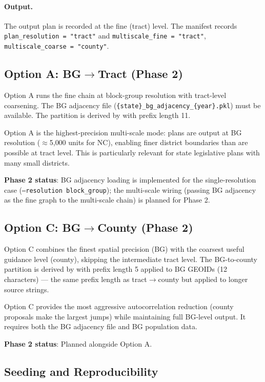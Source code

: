 \paragraph{Output.}
The output plan is recorded at the fine (tract) level.
The manifest records \texttt{plan\_resolution = "tract"} and
\texttt{multiscale\_fine = "tract"}, \texttt{multiscale\_coarse = "county"}.

\subsection{Option A: BG$\to$Tract (Phase 2)}
\label{ssec:optiona}

Option A runs the fine chain at block-group resolution with tract-level
coarsening.
The BG adjacency file (\texttt{\{state\}\_bg\_adjacency\_\{year\}.pkl})
must be available.
The partition is derived by \derive{} with prefix length 11.

Option A is the highest-precision multi-scale mode: plans are output at
BG resolution ($\approx$5{,}000 units for NC), enabling finer district
boundaries than are possible at tract level.
This is particularly relevant for state legislative plans with many small
districts.

\textbf{Phase 2 status}: BG adjacency loading is implemented for the
single-resolution case (\texttt{--resolution block\_group});
the multi-scale wiring (passing BG adjacency as the fine graph to the
multi-scale chain) is planned for Phase 2.

\subsection{Option C: BG$\to$County (Phase 2)}
\label{ssec:optionc}

Option C combines the finest spatial precision (BG) with the coarsest
useful guidance level (county), skipping the intermediate tract level.
The BG-to-county partition is derived by \derive{} with prefix length 5
applied to BG GEOIDs (12 characters) --- the same prefix length as
tract$\to$county but applied to longer source strings.

Option C provides the most aggressive autocorrelation reduction (county
proposals make the largest jumps) while maintaining full BG-level output.
It requires both the BG adjacency file and BG population data.

\textbf{Phase 2 status}: Planned alongside Option A.

\subsection{Seeding and Reproducibility}

